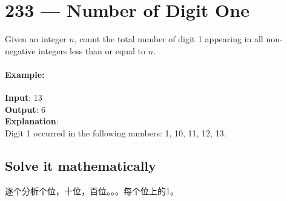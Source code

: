 \section{233 --- Number of Digit One}
Given an integer $n$, count the total number of digit 1 appearing in all non-negative integers less than or equal to $n$.

\paragraph{Example:}

\begin{flushleft}
\textbf{Input}: 13
\\
\textbf{Output}: 6 
\\
\textbf{Explanation}: 
\\
Digit 1 occurred in the following numbers: 1, 10, 11, 12, 13.
\end{flushleft}
\subsection{Solve it mathematically}
逐个分析个位，十位，百位。。。每个位上的1。

